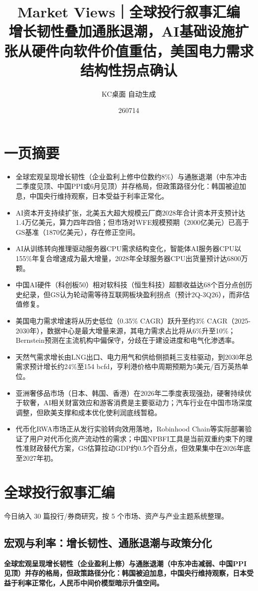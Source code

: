 \documentclass[11pt]{ctexart}
\title{\textbf{Market Views｜全球投行叙事汇编}\\[0.4em]{\large 增长韧性叠加通胀退潮，AI基础设施扩张从硬件向软件价值重估，美国电力需求结构性拐点确认}}
\author{KC桌面 自动生成}
\date{260714}
\begin{document}
\maketitle
\tableofcontents
\newpage
\section{一页摘要}
\begin{itemize}
  \item 全球宏观呈现增长韧性（企业盈利上修中位数约8\%）与通胀退潮（中东冲击二季度见顶、中国PPI或6月见顶）并存格局，但政策路径分化：韩国被迫加息，中国央行维持观察，日本受益于利率正常化。
  \item AI资本开支持续扩张，北美五大超大规模云厂商2028年合计资本开支预计达1.4万亿美元，算力四年四倍；但市场对WFE规模预期（2000亿美元）已高于GS基准（1870亿美元），存在修正空间。
  \item AI从训练转向推理驱动服务器CPU需求结构变化，智能体AI服务器CPU以155\%年复合增速成为最大增量，2028年全球服务器CPU出货量预计达6800万颗。
  \item 中国AI硬件（科创板50）相对软科技（恒生科技）超额收益达68个百分点创历史纪录，但GS认为轮动需等待互联网板块盈利拐点（预计2Q-3Q26），而非估值修复。
  \item 美国电力需求增速将从历史低位（0.35\% CAGR）跃升至约3\% CAGR（2025-2030年），数据中心是最大增量来源，其电力需求占比将从6\%升至10\%；Bernstein预测在主流机构中偏保守，分歧在于建设进度和电气化渗透率。
  \item 天然气需求增长由LNG出口、电力用气和供给侧损耗三支柱驱动，到2030年总需求预计增长约24\%至154 bcfd，亨利港价格中周期预期为5美元/百万英热单位。
  \item 亚洲奢侈品市场（日本、韩国、香港）在2026年二季度表现强劲，硬奢持续优于软奢，AI相关财富效应和游客消费是主要驱动力；汽车行业在中国市场深度调整，但欧美支撑和成本优化使利润底线暂稳。
  \item 代币化RWA市场正从发行实验转向效用落地，Robinhood Chain等实际部署验证了用户对代币化资产流动性的需求；中国NPBFI工具是当前双重约束下的理性准财政替代方案，GS估算拉动GDP约0.5个百分点，但效果集中在2026年底至2027年初。
\end{itemize}
\section{全球投行叙事汇编}
今日纳入 30 篇投行/券商研究，按 5 个市场、资产与产业主题系统整理。
\newpage
\subsection{宏观与利率：增长韧性、通胀退潮与政策分化}
\textbf{全球宏观呈现增长韧性（企业盈利上修）与通胀退潮（中东冲击减弱、中国PPI见顶）并存的格局，但政策路径分化：韩国被迫加息，中国央行维持观察，日本受益于利率正常化，人民币中间价模型暗示升值空间。}
\end{document}
